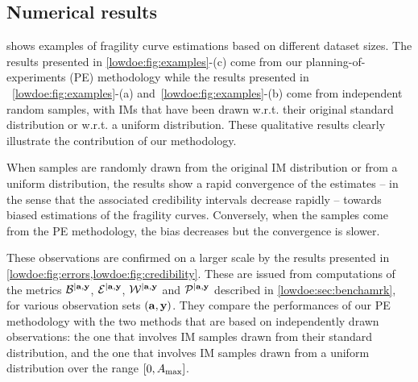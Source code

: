 \subsection{Numerical results}\label{lowdoe:sec:results}

%
 shows examples of fragility curve estimations based on different dataset sizes. 
The results presented in \cref{lowdoe:fig:examples}-(c) come from our planning-of-experiments (PE) methodology while the results presented in ~\ref{lowdoe:fig:examples}-(a) and~\ref{lowdoe:fig:examples}-(b) come from independent random samples, with IMs that have been drawn w.r.t. their original standard distribution or w.r.t. a uniform distribution. These qualitative results clearly illustrate the contribution of our methodology.


When samples are randomly drawn from the original IM distribution {or from a uniform distribution}, the results show a rapid convergence of the estimates -- in the sense that the associated credibility intervals decrease rapidly -- towards biased estimations of the fragility curves. Conversely, when the samples come from the PE methodology, the bias decreases but the convergence is slower.

These observations are confirmed on a larger scale by the results presented in \cref{lowdoe:fig:errors,lowdoe:fig:credibility}. 
These are issued from computations of the metrics $\mathcal{B}^{|\mathbf{a},\mathbf{y}}$, $\mathcal{E}^{|\mathbf{a},\mathbf{y}}$, $\mathcal{W}^{|\mathbf{a},\mathbf{y}}$ and $\mathcal{P}^{|\mathbf{a},\mathbf{y}}$ described in \cref{lowdoe:sec:benchamrk}, for various observation sets $(\mathbf{a},\mathbf{y})$. They compare the performances of our PE methodology with the two methods that are based on independently drawn observations: the one that involves  IM samples drawn from their standard distribution, and the one that involves IM samples drawn from a uniform distribution over the range $[0,A_{\rm max}]$.

